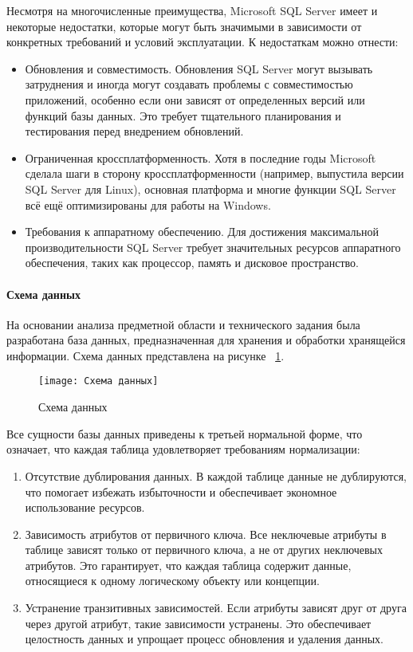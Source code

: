 Несмотря на многочисленные преимущества, Microsoft SQL Server имеет и некоторые недостатки, которые могут быть значимыми в зависимости от конкретных требований и условий эксплуатации. К недостаткам можно отнести:
\begin{itemize}
	\item Обновления и совместимость. Обновления SQL Server могут вызывать затруднения и иногда могут создавать проблемы с совместимостью приложений, особенно если они зависят от определенных версий или функций базы данных. Это требует тщательного планирования и тестирования перед внедрением обновлений.
	\item Ограниченная кроссплатформенность. Хотя в последние годы Microsoft сделала шаги в сторону кроссплатформенности (например, выпустила версии SQL Server для Linux), основная платформа и многие функции SQL Server всё ещё оптимизированы для работы на Windows. 
	\item Требования к аппаратному обеспечению. Для достижения максимальной производительности SQL Server требует значительных ресурсов аппаратного обеспечения, таких как процессор, память и дисковое пространство.
\end{itemize}

\paragraph{Схема данных}

На основании анализа предметной области и технического задания была разработана база данных, предназначенная для хранения и обработки хранящейся информации. Схема данных представлена на рисунке ~\ref{templ:image1}.
\begin{figure}[H]
	\texttt{[image: Схема данных]}
	\caption{Схема данных}
	\label{templ:image1}
\end{figure}

Все сущности базы данных приведены к третьей нормальной форме, что означает, что каждая таблица удовлетворяет требованиям нормализации:
\begin{enumerate}
	\item Отсутствие дублирования данных. В каждой таблице данные не дублируются, что помогает избежать избыточности и обеспечивает экономное использование ресурсов.
	\item Зависимость атрибутов от первичного ключа. Все неключевые атрибуты в таблице зависят только от первичного ключа, а не от других неключевых атрибутов. Это гарантирует, что каждая таблица содержит данные, относящиеся к одному логическому объекту или концепции.
	\item Устранение транзитивных зависимостей. Если атрибуты зависят друг от друга через другой атрибут, такие зависимости устранены. Это обеспечивает целостность данных и упрощает процесс обновления и удаления данных.
\end{enumerate}

